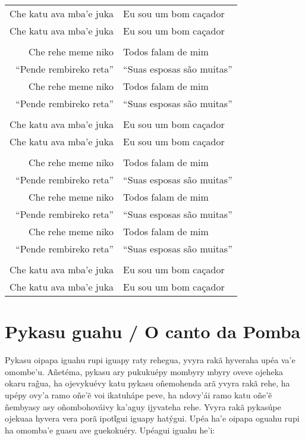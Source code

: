 \begin{itemize}
\begin{table}[]
\begin{tabular}{rl}
Che katu ava mba'e juka          & Eu sou um bom caçador           \\
Che katu ava mba'e juka          & Eu sou um bom caçador           \\
                  &                     \\
Che rehe meme niko  		& Todos falam de mim \\
``Pende rembireko reta''          & ``Suas esposas são muitas''           \\
Che rehe meme niko          & Todos falam de mim           \\
``Pende rembireko reta''  		& ``Suas esposas são muitas'' \\
                  &                     \\
Che katu ava mba'e juka          & Eu sou um bom caçador           \\
Che katu ava mba'e juka          & Eu sou um bom caçador           \\                  
                  &                     \\
Che rehe meme niko  		& Todos falam de mim \\
``Pende rembireko reta''          & ``Suas esposas são muitas''           \\
Che rehe meme niko  		& Todos falam de mim \\
``Pende rembireko reta''          & ``Suas esposas são muitas''           \\
Che rehe meme niko  		& Todos falam de mim \\
``Pende rembireko reta''          & ``Suas esposas são muitas''           \\
                  &                     \\
Che katu ava mba'e juka          & Eu sou um bom caçador           \\
Che katu ava mba'e juka          & Eu sou um bom caçador           \\
\end{tabular}
\end{table}


\chapter{Pykasu guahu / O canto da Pomba}

Pykasu oipapa iguahu rupi iguapy raty rehegua, yvyra rakã hyveraha upéa
va'e omombe'u. Añetéma, pykasu ary pukukuépy mombyry mbyry oveve ojeheka
okaru rag̃ua, ha ojevykuévy katu pykasu oñemohenda arã yvyra rakã rehe,
ha upépy ovy'a ramo oñe'ẽ voi ikatuhápe peve, ha ndovy'ái ramo katu
oñe'ẽ ñembyasy asy oñombohováivy ka'aguy ijyvateha rehe. Yvyra rakã
pykasúpe ojekuaa hyvera vera porã ipotῖgui iguapy hatýgui. Upéa ha'e
oipapa oguahu rupi ha omomba'e guasu ave guekokuéry. Upéagui iguahu
he'i:


\end{itemize}
